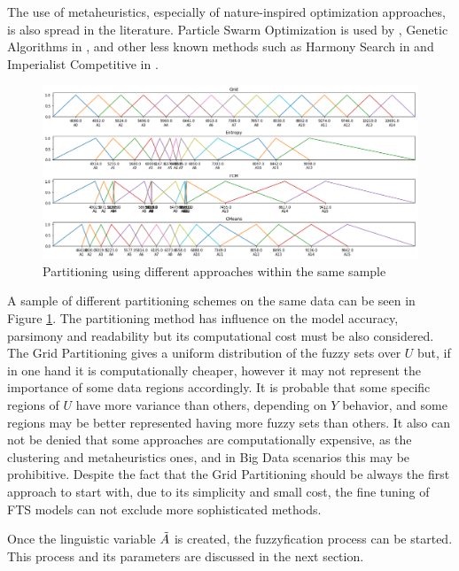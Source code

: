 The use of metaheuristics, especially of nature-inspired optimization approaches, is also spread in the literature. Particle Swarm Optimization is used by \cite{Davari2009, Kuo2009, Hsu2010, Huang2011, Zhang2018a}, Genetic Algorithms in \cite{Chen2006a, Enayatifar2013, Zhang2018}, and other less known methods such as Harmony Search in \cite{Talarposhti2016a, Jiang2017} and Imperialist Competitive in \cite{Sadaei2017}. 

\begin{figure}
    \centering
    \includegraphics[width=\textwidth]{figures/partitioners.png}
    \caption{Partitioning using different approaches within the same sample}
    \label{fig:partitioners}
\end{figure}

A sample of different partitioning schemes on the same data can be seen in Figure \ref{fig:partitioners}. The partitioning method has influence on the model accuracy, parsimony and readability but its computational cost must be also considered. The Grid Partitioning gives a uniform distribution of the fuzzy sets over $U$ but, if in one hand it is computationally cheaper, however it may not represent the importance of some data regions accordingly. It is probable that some specific regions of $U$ have more variance than others, depending on $Y$ behavior, and some regions may be better represented having more fuzzy sets than others. It also can not be denied that some approaches are computationally expensive, as the clustering and metaheuristics ones, and in Big Data scenarios this may be prohibitive. Despite the fact that the Grid Partitioning should be always the first approach to start with, due to its simplicity and small cost, the fine tuning of FTS models can not exclude more sophisticated methods.

Once the linguistic variable $\tilde{A}$ is created, the fuzzyfication process can be started. This process and its parameters are discussed in the next section.


